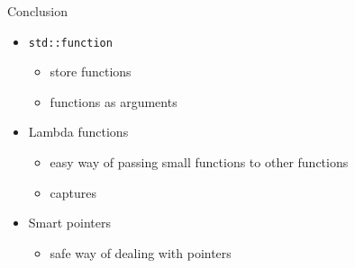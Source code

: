 \documentclass[10pt]{beamer}
\begin{document}
\begin{frame}[fragile,label={sec:orgd729b3e}]{Conclusion}
 \begin{itemize}
\item \texttt{std::function}
\begin{itemize}
\item store functions
\item functions as arguments
\end{itemize}
\item Lambda functions
\begin{itemize}
\item easy way of passing small functions to other functions
\item captures
\end{itemize}
\item Smart pointers
\begin{itemize}
\item safe way of dealing with pointers
\end{itemize}
\end{itemize}
\end{frame}
\end{document}
